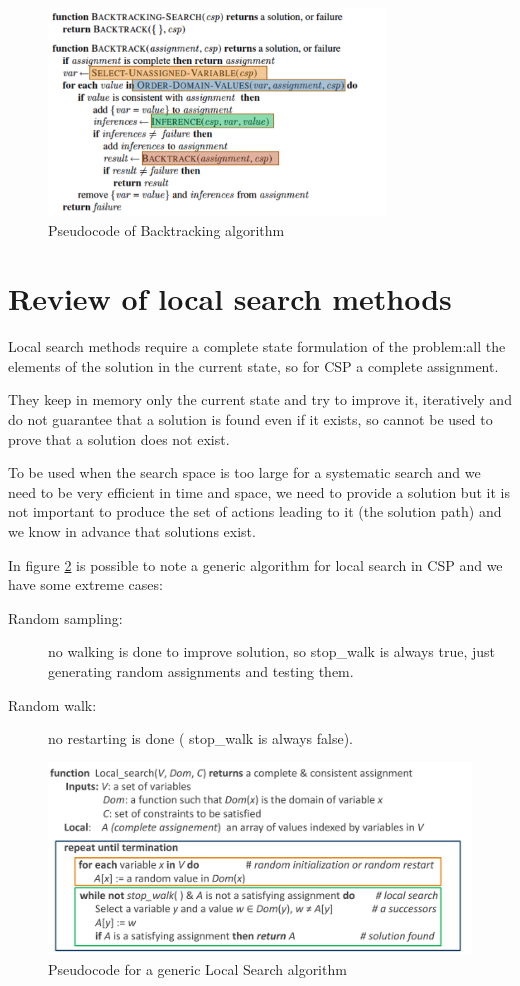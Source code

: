 \begin{figure}
	\includegraphics[width=0.8\textwidth]{Images/backtracking}
	\caption{Pseudocode of Backtracking algorithm}
	\label{img:backtracking}
\end{figure}

\section{Review of local search methods}
Local search methods require a complete state formulation of the problem:all the 
elements of the solution in the current state, so for CSP a complete assignment.

They keep in memory only the current state and try to improve it, iteratively and 
do not guarantee that a solution is found even if it exists,
so cannot be used to prove that a solution does not exist.

To be used when the search space is too large for a systematic search 
and we need to be very efficient in time and space, we need to provide a solution
but it is not important to produce the set of actions leading to it (the solution path)
and we know in advance that solutions exist.

In figure \ref{img:localSearch} is possible to note a generic algorithm for local 
search in CSP and we have some extreme cases:
\begin{description}
    \item [Random sampling: ] no walking is done to improve solution, so stop\_walk
	    is always true, just generating random assignments and testing them.
    \item [Random walk: ] no restarting is done ( stop\_walk is always false).
\end{description}

\begin{figure}
	\includegraphics[width=\textwidth]{Images/genericLocalSearch}
	\caption{Pseudocode for a generic Local Search algorithm}
	\label{img:localSearch}
\end{figure}

